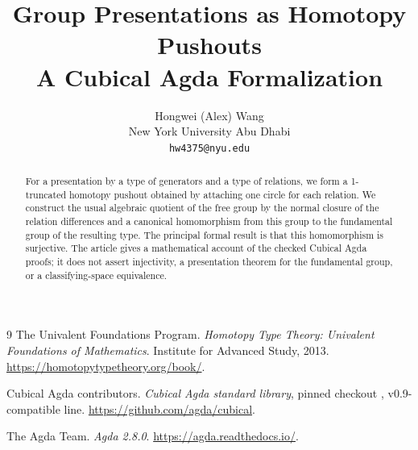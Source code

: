 \documentclass[11pt]{amsart}
\title{Group Presentations as Homotopy Pushouts\\
\large A Cubical Agda Formalization}
\author{
Hongwei (Alex) Wang\\[3pt]
\small New York University Abu Dhabi\\
\small \texttt{hw4375@nyu.edu}
}
\begin{document}
\begin{abstract}
For a presentation by a type of generators and a type of relations, we form a
1-truncated homotopy pushout obtained by attaching one circle for each
relation.  We construct the usual algebraic quotient of the free group by the
normal closure of the relation differences and a canonical homomorphism from
this group to the fundamental group of the resulting type.  The principal
formal result is that this homomorphism is surjective.  The article gives a
mathematical account of the checked Cubical Agda proofs; it does not assert
injectivity, a presentation theorem for the fundamental group, or a
classifying-space equivalence.
\end{abstract}
\maketitle
\pagestyle{plain}












\begin{thebibliography}{9}
The Univalent Foundations Program.
\newblock \emph{Homotopy Type Theory: Univalent Foundations of Mathematics}.
\newblock Institute for Advanced Study, 2013.
\newblock \url{https://homotopytypetheory.org/book/}.

Cubical Agda contributors.
\newblock \emph{Cubical Agda standard library}, pinned checkout
, v0.9-compatible line.
\newblock \url{https://github.com/agda/cubical}.

The Agda Team.
\newblock \emph{Agda 2.8.0}.
\newblock \url{https://agda.readthedocs.io/}.
\end{thebibliography}
\end{document}
